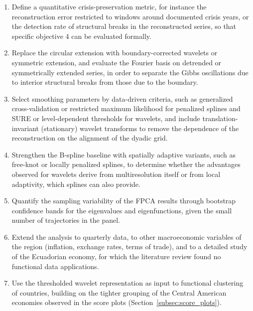 \begin{enumerate}
    \item Define a quantitative crisis-preservation metric, for instance
    the reconstruction error restricted to windows around documented
    crisis years, or the detection rate of structural breaks in the
    reconstructed series, so that specific objective 4 can be evaluated
    formally.

    \item Replace the circular extension with boundary-corrected wavelets
    or symmetric extension, and evaluate the Fourier basis on detrended
    or symmetrically extended series, in order to separate the Gibbs
    oscillations due to interior structural breaks from those due to the
    boundary.

    \item Select smoothing parameters by data-driven criteria, such as
    generalized cross-validation or restricted maximum likelihood for
    penalized splines and SURE or level-dependent thresholds for
    wavelets, and include translation-invariant (stationary) wavelet
    transforms to remove the dependence of the reconstruction on the
    alignment of the dyadic grid.

    \item Strengthen the B-spline baseline with spatially adaptive
    variants, such as free-knot or locally penalized splines, to
    determine whether the advantages observed for wavelets derive from
    multiresolution itself or from local adaptivity, which splines can
    also provide.

    \item Quantify the sampling variability of the FPCA results through
    bootstrap confidence bands for the eigenvalues and eigenfunctions,
    given the small number of trajectories in the panel.

    \item Extend the analysis to quarterly data, to other macroeconomic
    variables of the region (inflation, exchange rates, terms of trade),
    and to a detailed study of the Ecuadorian economy, for which the
    literature review found no functional data applications.

    \item Use the thresholded wavelet representation as input to
    functional clustering of countries, building on the tighter grouping
    of the Central American economies observed in the score plots
    (Section~\ref{subsec:score_plots}).
\end{enumerate}
